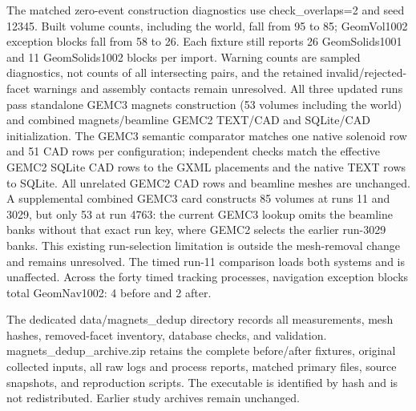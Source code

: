 The matched zero-event construction diagnostics use check\_overlaps=2 and seed 12345. Built volume counts,
including the world, fall from 95 to 85; GeomVol1002 exception blocks fall from 58 to 26. Each fixture still
reports 26 GeomSolids1001 and 11 GeomSolids1002 blocks per import. Warning counts are sampled diagnostics, not
counts of all intersecting pairs, and the retained invalid/rejected-facet warnings and assembly contacts
remain unresolved. All three updated runs pass standalone GEMC3 magnets construction (53 volumes including the
world) and combined magnets/beamline GEMC2 TEXT/CAD and SQLite/CAD initialization. The GEMC3 semantic
comparator matches one native solenoid row and 51 CAD rows per configuration; independent checks match the
effective GEMC2 SQLite CAD rows to the GXML placements and the native TEXT rows to SQLite. All unrelated GEMC2
CAD rows and beamline meshes are unchanged. A supplemental combined GEMC3 card constructs 85 volumes at runs
11 and 3029, but only 53 at run 4763: the current GEMC3 lookup omits the beamline banks without that exact run
key, where GEMC2 selects the earlier run-3029 banks. This existing run-selection limitation is outside the
mesh-removal change and remains unresolved. The timed run-11 comparison loads both systems and is unaffected.
Across the forty timed tracking processes, navigation exception blocks total GeomNav1002: 4 before and 2
after.

The dedicated data/magnets\_dedup directory records all measurements, mesh hashes, removed-facet inventory,
database checks, and validation. magnets\_dedup\_archive.zip retains the complete before/after fixtures,
original collected inputs, all raw logs and process reports, matched primary files, source snapshots, and
reproduction scripts. The executable is identified by hash and is not redistributed. Earlier study archives
remain unchanged.
